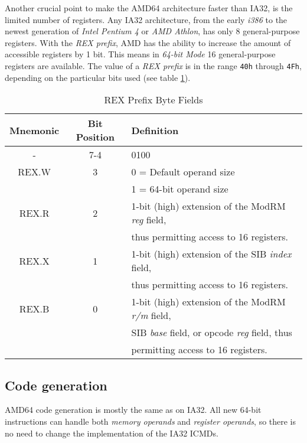 Another crucial point to make the AMD64 architecture faster than IA32,
is the limited number of registers. Any IA32 architecture, from the
early \textit{i386} to the newest generation of \textit{Intel Pentium
4} or \textit{AMD Athlon}, has only 8 general-purpose registers. With
the \textit{REX prefix}, AMD has the ability to increase the amount of
accessible registers by 1 bit. This means in \textit{64-bit Mode} 16
general-purpose registers are available. The value of a \textit{REX
prefix} is in the range \texttt{40h} through \texttt{4Fh}, depending
on the particular bits used (see table
\ref{tablerexprefixbytefields}).

\begin{table}
\begin{center}
\begin{tabular}[b]{|c|c|l|}
\hline
Mnemonic & Bit Position & Definition \\ \hline
-        & 7-4          & 0100 \\ \hline
REX.W    & 3            & 0 = Default operand size \\
         &              & 1 = 64-bit operand size \\ \hline
REX.R    & 2            & 1-bit (high) extension of the ModRM \textit{reg} field, \\
         &              & thus permitting access to 16 registers. \\ \hline
REX.X    & 1            & 1-bit (high) extension of the SIB \textit{index} field, \\
         &              & thus permitting access to 16 registers. \\ \hline
REX.B    & 0            & 1-bit (high) extension of the ModRM \textit{r/m} field, \\
         &              & SIB \textit{base} field, or opcode \textit{reg} field, thus \\
         &              & permitting access to 16 registers. \\ \hline
\end{tabular}
\caption{REX Prefix Byte Fields}
\label{tablerexprefixbytefields}
\end{center}
\end{table}


\subsection{Code generation}

AMD64 code generation is mostly the same as on IA32. All new 64-bit
instructions can handle both \textit{memory operands} and
\textit{register operands}, so there is no need to change the
implementation of the IA32 ICMDs.


